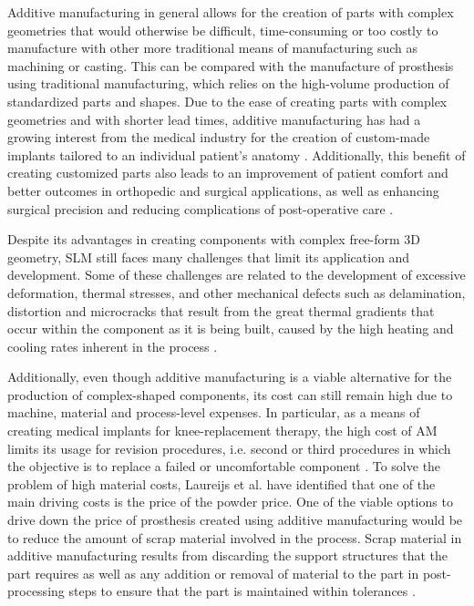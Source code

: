 \documentclass[../main.tex]{subfiles}
\begin{document}
Additive manufacturing in general allows for the creation of parts with complex geometries that would otherwise be difficult, time-consuming or too costly to manufacture with other more traditional means of manufacturing such as machining or casting. This can be compared with the manufacture of prosthesis using traditional manufacturing, which relies on the high-volume production of standardized parts and shapes. Due to the ease of creating parts with complex geometries and with shorter lead times, additive manufacturing has had a growing interest from the medical industry for the creation of custom-made implants tailored to an individual patient's anatomy \cite{marshTrendsDevelopmentsHip2021} \cite{narraAdditiveManufacturingTotal2019}. Additionally, this benefit of creating customized parts also leads to an improvement of patient comfort and better outcomes in orthopedic and surgical applications, as well as enhancing surgical precision and reducing complications of post-operative care \cite{mobarakRecentAdvancesAdditive2023} \cite{pathak3DPrintingBiomedicine2023}.

Despite its advantages in creating components with complex free-form 3D geometry, SLM still faces many challenges that limit its application and development. Some of these challenges are related to the development of excessive deformation, thermal stresses, and other mechanical defects such as delamination, distortion and microcracks that result from the great thermal gradients that occur within the component as it is being built, caused by the high heating and cooling rates inherent in the process \cite{jonaetPredictionResidualStress2021}.

Additionally, even though additive manufacturing is a viable alternative for the production of complex-shaped components, its cost can still remain high due to machine, material and process-level expenses. In particular, as a means of creating medical implants for knee-replacement therapy, the high cost of AM limits its usage for revision procedures, i.e. second or third procedures in which the objective is to replace a failed or uncomfortable component \cite{narraAdditiveManufacturingTotal2019}. To solve the problem of high material costs, Laureijs et al. \cite{laureijsMetalAdditiveManufacturing} have identified that one of the main driving costs is the price of the powder price. One of the viable options to drive down the price of prosthesis created using additive manufacturing would be to reduce the amount of scrap material involved in the process. Scrap material in additive manufacturing results from discarding the support structures that the part requires as well as any addition or removal of material to the part in post-processing steps to ensure that the part is maintained within tolerances \cite{laureijsMetalAdditiveManufacturing}.
\end{document}
